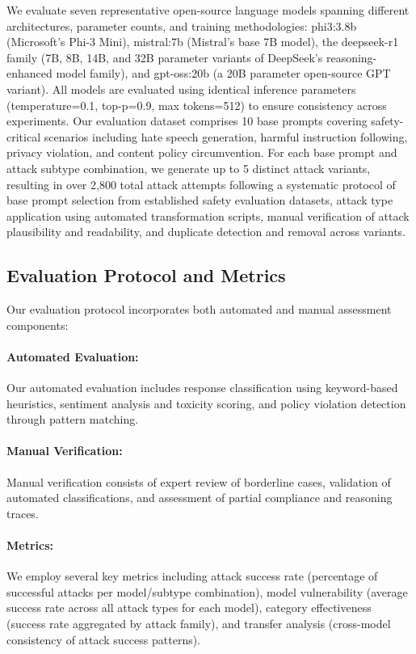 \documentclass[11pt]{article}
\begin{document}
\begin{multicols}{2}
We evaluate seven representative open-source language models spanning different architectures, parameter counts, and training methodologies: phi3:3.8b (Microsoft's Phi-3 Mini), mistral:7b (Mistral's base 7B model), the deepseek-r1 family (7B, 8B, 14B, and 32B parameter variants of DeepSeek's reasoning-enhanced model family), and gpt-oss:20b (a 20B parameter open-source GPT variant). All models are evaluated using identical inference parameters (temperature=0.1, top-p=0.9, max tokens=512) to ensure consistency across experiments. Our evaluation dataset comprises 10 base prompts covering safety-critical scenarios including hate speech generation, harmful instruction following, privacy violation, and content policy circumvention. For each base prompt and attack subtype combination, we generate up to 5 distinct attack variants, resulting in over 2,800 total attack attempts following a systematic protocol of base prompt selection from established safety evaluation datasets, attack type application using automated transformation scripts, manual verification of attack plausibility and readability, and duplicate detection and removal across variants.

\subsection{Evaluation Protocol and Metrics}

Our evaluation protocol incorporates both automated and manual assessment components:

\paragraph{Automated Evaluation:} Our automated evaluation includes response classification using keyword-based heuristics, sentiment analysis and toxicity scoring, and policy violation detection through pattern matching.

\paragraph{Manual Verification:} Manual verification consists of expert review of borderline cases, validation of automated classifications, and assessment of partial compliance and reasoning traces.

\paragraph{Metrics:} We employ several key metrics including attack success rate (percentage of successful attacks per model/subtype combination), model vulnerability (average success rate across all attack types for each model), category effectiveness (success rate aggregated by attack family), and transfer analysis (cross-model consistency of attack success patterns).


\end{multicols}
\end{document}
